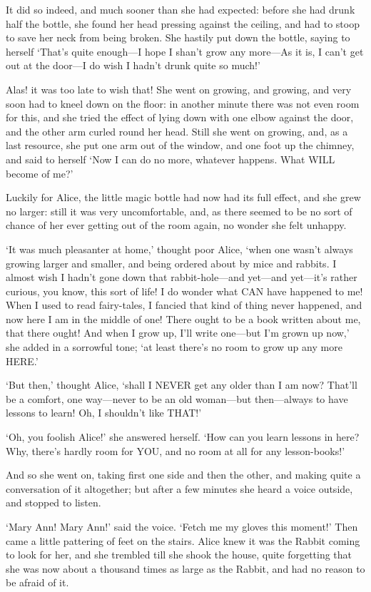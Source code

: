 \documentclass[12pt]{article}
\begin{document}
\begin{Parallel}[p]{}{}
{It did so indeed, and much sooner than she had expected: before she had drunk half the bottle, she found her head pressing against the ceiling, and had to stoop to save her neck from being broken. She hastily put down the bottle, saying to herself ‘That’s quite enough—I hope I shan’t grow any more—As it is, I can’t get out at the door—I do wish I hadn’t drunk quite so much!’

Alas! it was too late to wish that! She went on growing, and growing, and very soon had to kneel down on the floor: in another minute there was not even room for this, and she tried the effect of lying down with one elbow against the door, and the other arm curled round her head. Still she went on growing, and, as a last resource, she put one arm out of the window, and one foot up the chimney, and said to herself ‘Now I can do no more, whatever happens. What WILL become of me?’

Luckily for Alice, the little magic bottle had now had its full effect, and she grew no larger: still it was very uncomfortable, and, as there seemed to be no sort of chance of her ever getting out of the room again, no wonder she felt unhappy.

‘It was much pleasanter at home,’ thought poor Alice, ‘when one wasn’t always growing larger and smaller, and being ordered about by mice and rabbits. I almost wish I hadn’t gone down that rabbit-hole—and yet—and yet—it’s rather curious, you know, this sort of life! I do wonder what CAN have happened to me! When I used to read fairy-tales, I fancied that kind of thing never happened, and now here I am in the middle of one! There ought to be a book written about me, that there ought! And when I grow up, I’ll write one—but I’m grown up now,’ she added in a sorrowful tone; ‘at least there’s no room to grow up any more HERE.’

‘But then,’ thought Alice, ‘shall I NEVER get any older than I am now? That’ll be a comfort, one way—never to be an old woman—but then—always to have lessons to learn! Oh, I shouldn’t like THAT!’

‘Oh, you foolish Alice!’ she answered herself. ‘How can you learn lessons in here? Why, there’s hardly room for YOU, and no room at all for any lesson-books!’

And so she went on, taking first one side and then the other, and making quite a conversation of it altogether; but after a few minutes she heard a voice outside, and stopped to listen.

‘Mary Ann! Mary Ann!’ said the voice. ‘Fetch me my gloves this moment!’ Then came a little pattering of feet on the stairs. Alice knew it was the Rabbit coming to look for her, and she trembled till she shook the house, quite forgetting that she was now about a thousand times as large as the Rabbit, and had no reason to be afraid of it.

}
\end{Parallel}
\end{document}
